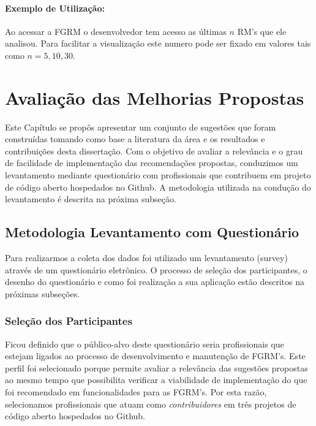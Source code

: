 \paragraph{Exemplo de Utilização:}
\label{par:exemplo_de_utilização_s04}
Ao acessar a FGRM o desenvolvedor tem acesso as últimas $n$ RM's que ele analisou.
Para facilitar a visualização este numero pode ser fixado em valores tais como
$n = {5, 10, 30}$.


\section{Avaliação das Melhorias Propostas}
\label{sec:sug_melhoria_avaliacao_das_melhorias}

Este Capítulo se propôs apresentar um conjunto de sugestões que foram
construídas tomando como base a literatura da área e os resultados e
contribuições desta dissertação. Com o objetivo de avaliar a relevância e o grau
de facilidade de implementação das recomendações propostas, conduzimos um
levantamento mediante questionário com profissionais que contribuem em projeto
de código aberto hospedados no Github. A metodologia utilizada na condução do
levantamento é descrita na próxima subseção.

\subsection{Metodologia Levantamento com Questionário}
\label{sub:sug_melhoria_metodologia_levantamento}

Para realizarmos a coleta dos dados foi utilizado um levantamento (survey)
através de um questionário eletrônico. O processo de seleção dos participantes,
o desenho do questionário e como foi realização a sua aplicação estão descritos
na próximas subseções.

\subsubsection{Seleção dos Participantes}
\label{ssub:sug_melhoria_selecao_participantes}

Ficou definido que o público-alvo deste questionário seria profissionais que
estejam ligados ao processo de desenvolvimento e manutenção de FGRM's. Este
perfil foi selecionado porque permite avaliar a relevância das sugestões
propostas ao mesmo tempo que possibilita verificar a viabilidade de
implementação do que foi recomendado em funcionalidades para as FGRM's. Por esta
razão, selecionamos profissionais que atuam como \textit{contribuidores} em três
projetos de código aberto hospedados no Github.

